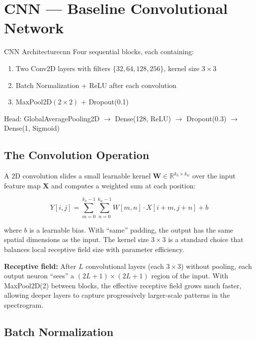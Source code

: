 \documentclass[12pt]{report}
\begin{document}
\section{CNN --- Baseline Convolutional Network}

\begin{tecbox}{CNN Architecture}{cnn}
    Four sequential blocks, each containing:
    \begin{enumerate}[noitemsep]
        \item Two Conv2D layers with filters $\{32, 64, 128, 256\}$, kernel size $3 \times 3$
        \item Batch Normalization + ReLU after each convolution
        \item MaxPool2D$(2 \times 2)$ + Dropout(0.1)
    \end{enumerate}
    Head: GlobalAveragePooling2D $\to$ Dense(128, ReLU) $\to$ Dropout(0.3) $\to$ Dense(1, Sigmoid)
\end{tecbox}

\subsection{The Convolution Operation}

A 2D convolution slides a small learnable kernel $\bm{W} \in \mathbb{R}^{k_h \times k_w}$
over the input feature map $\bm{X}$ and computes a weighted sum at each position:

\begin{equation}
    Y[i, j] = \sum_{m=0}^{k_h-1} \sum_{n=0}^{k_w-1} W[m, n] \cdot X[i+m, j+n] + b
\end{equation}

where $b$ is a learnable bias. With ``same'' padding, the output has the same spatial
dimensions as the input. The kernel size $3 \times 3$ is a standard choice that balances
local receptive field size with parameter efficiency.

\textbf{Receptive field:} After $L$ convolutional layers (each $3 \times 3$) without pooling,
each output neuron ``sees'' a $(2L+1) \times (2L+1)$ region of the input. With MaxPool2D(2)
between blocks, the effective receptive field grows much faster, allowing deeper layers to
capture progressively larger-scale patterns in the spectrogram.

\subsection{Batch Normalization}
\end{document}
